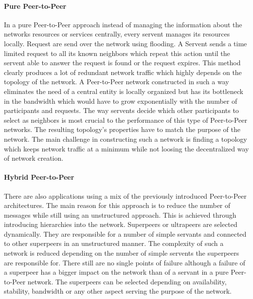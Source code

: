 \paragraph{Pure Peer-to-Peer}
In a pure Peer-to-Peer approach instead of managing the information about the
networks resources or services centrally, every servent manages its resources
locally. Request are send over the network using flooding. A Servent sends a
time limited request to all its known neighbors which repeat this action until
the servent able to answer the request is found or the request expires. This
method clearly produces a lot of redundant network traffic which highly depends
on the topology of the network. A Peer-to-Peer network constructed in such a way
eliminates the need of a central entity is locally organized but has its
bottleneck in the bandwidth which would have to grow exponentially with the
number of participants and requests. The way servents decide which other
participants to select as neighbors is most crucial to the performance of this
type of Peer-to-Peer networks. The resulting topology's properties have to
match the purpose of the network. The main challenge in constructing such a
network is finding a topology which keeps network traffic at a minimum while not
loosing the decentralized way of network creation.
\paragraph{Hybrid Peer-to-Peer}
There are also applications using a mix of the previously introduced
Peer-to-Peer architectures. The main reason for this approach is to reduce
the number of messages while still using an unstructured approach. This is
achieved through introducing hierarchies into the network. Superpeers or
ultrapeers are selected dynamically. They are responsible for a number of simple
servants and connected to other superpeers in an unstructured manner. The complexity of such a network
is reduced depending on the number of simple servents the superpeers are
responsible for. There still are no single points of failure although a failure
of a superpeer has a bigger impact on the network than of a servant in a pure
Peer-to-Peer network. The superpeers can be selected depending on availability,
stability, bandwidth or any other aspect serving the purpose of the network.
